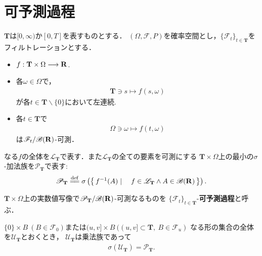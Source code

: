 \section{可予測過程}
	$\mathbf{T}$は$[0,\infty)$か$[0,T]$を表すものとする．
	$(\Omega, \mathscr{F}, P)$を確率空間とし，$\{\mathscr{F}_t\}_{t \in \mathbf{T}}$をフィルトレーションとする．
	
	\begin{itemize}
		\item $f:\mathbf{T} \times \Omega \longrightarrow \mathbf{R}$.
		
		\item 各$\omega \in \Omega$で，
			\begin{align}
				\mathbf{T} \ni s \longmapsto f(s,\omega)
			\end{align}
			が各$t \in \mathbf{T} \backslash \{0\}$において左連続.
			
		\item 各$t \in \mathbf{T}$で
			\begin{align}
				\Omega \ni \omega \longmapsto f(t,\omega)
			\end{align}
			は$\mathscr{F}_t/\mathscr{B}(\mathbf{R})$-可測．
	\end{itemize}
	
	なる$f$の全体を$\mathscr{L}_{\mathbf{T}}$で表す．また$\mathscr{L}_{\mathbf{T}}$の全ての要素を可測にする
	$\mathbf{T} \times \Omega$上の最小の$\sigma$-加法族を$\mathscr{P}_{\mathbf{T}}$で表す:
	\begin{align}
		\mathscr{P}_{\mathbf{T}} \defeq 
		\sigma\left(\Set{f^{-1}(A)}{f \in \mathscr{L}_{\mathbf{T}} \wedge A \in \borel{\R}}\right).
	\end{align}
	
	$\mathbf{T} \times \Omega$上の実数値写像で$\mathscr{P}_{\mathbf{T}}/\mathscr{B}(\mathbf{R})$-可測なるものを
	$\{\mathscr{F}_t\}_{t \in \mathbf{T}}$-{\bf 可予測過程}と呼ぶ．
	
	\begin{screen}
		\begin{thm}\label{thm:pi_system_generating_predictable_sets}
			$\{0\} \times B\ (B \in \mathscr{F}_0)$または$(u,v] \times B\ ((u,v] \subset \mathbf{T},\ B \in \mathscr{F}_u)$
			なる形の集合の全体を$\mathscr{U}_{\mathbf{T}}$とおくとき，
			$\mathscr{U}_{\mathbf{T}}$は乗法族であって
			\begin{align}
				\sigma\left(\mathscr{U}_{\mathbf{T}}\right) = \mathscr{P}_{\mathbf{T}}.
			\end{align}
		\end{thm}
	\end{screen}
	
